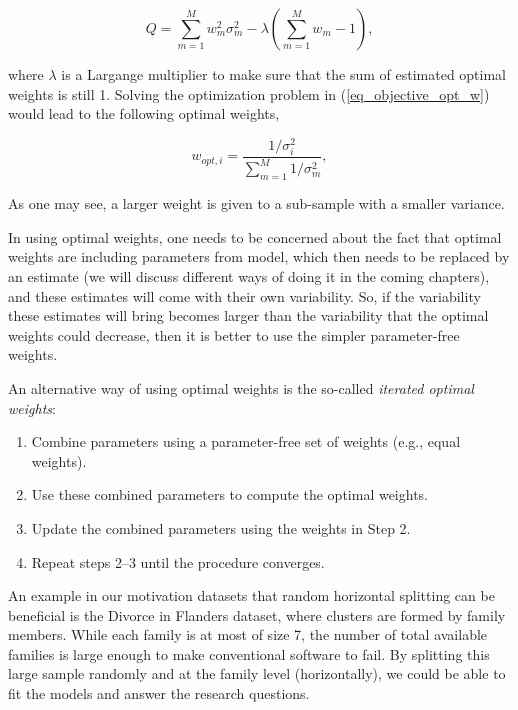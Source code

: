 \documentclass[11pt,a5paper,twoside]{book}
\begin{document}
\begin{equation}
\label{eq_objective_opt_w}
Q = \sum_{m=1}^M w_m^2 \sigma_m^2 - \lambda \left(\sum_{m=1}^M w_m -1 \right),
\end{equation}

where $\lambda$ is a Largange multiplier to make sure that the sum of estimated optimal weights is still 1. Solving the optimization problem in (\ref{eq_objective_opt_w}) would lead to the following optimal weights,

\begin{equation}
\label{eq_opt_w}
w_{opt, i} = \frac{1/\sigma^2_i}{\sum_{m=1}^M 1/\sigma^2_m},
\end{equation}

As one may see, a larger weight is given to a sub-sample with a smaller variance.


In using optimal weights, one needs to be concerned about the fact that optimal weights are including parameters from model, which then needs to be replaced by an estimate (we will discuss different ways of doing it in the coming chapters), and these estimates will come with their own variability. So, if the variability these estimates will bring becomes larger than the variability that the optimal weights could decrease, then it is better to use the simpler parameter-free weights.

An alternative way of using optimal weights is the so-called \emph{iterated optimal weights}:

\begin{enumerate}
\item Combine parameters using a parameter-free set of weights (e.g., equal weights).
\item Use these combined parameters to compute the optimal weights.
\item Update the combined parameters using the weights in Step 2.
\item Repeat steps 2--3 until the procedure converges.
\end{enumerate}

An example in our motivation datasets that random horizontal splitting can be beneficial is the Divorce in Flanders dataset, where clusters are formed by family members. While each family is at most of size 7, the number of total available families is large enough to make conventional software to fail. By splitting this large sample randomly and at the family level (horizontally), we could be able to fit the models and answer the research questions.
\end{document}
